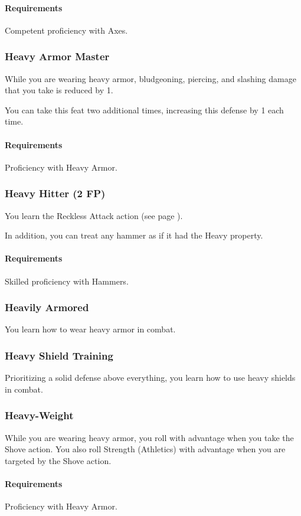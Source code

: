     \paragraph{Requirements} Competent proficiency with Axes.
\subsubsection{Heavy Armor Master} \label{feat::heavyarmormaster}
    While you are wearing heavy armor, bludgeoning, piercing, and slashing damage that you take is reduced by 1.

    You can take this feat two additional times, increasing this defense by 1 each time.
    \paragraph{Requirements} Proficiency with Heavy Armor.
\subsubsection{Heavy Hitter (2 FP)} \label{feat::heavyhitter}
    You learn the Reckless Attack action (see page \pageref{act::recklessattack}).

    In addition, you can treat any hammer as if it had the Heavy property.
    \paragraph{Requirements} Skilled proficiency with Hammers.
\subsubsection{Heavily Armored} \label{feat::heavilyarmored}
    You learn how to wear heavy armor in combat.
\subsubsection{Heavy Shield Training} \label{feat::heavyshieldtraining}
    Prioritizing a solid defense above everything, you learn how to use heavy shields in combat.
\subsubsection{Heavy-Weight} \label{feat::heavyweight}
    While you are wearing heavy armor, you roll with advantage when you take the Shove action.
    You also roll Strength (Athletics) with advantage when you are targeted by the Shove action.
    \paragraph{Requirements} Proficiency with Heavy Armor.
